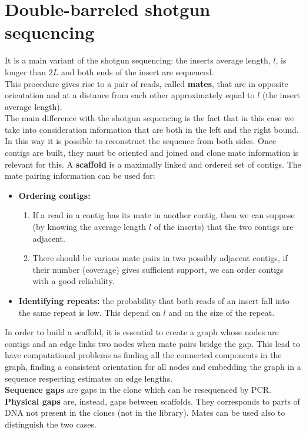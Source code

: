 \section{Double-barreled shotgun sequencing}
It is a main variant of the shotgun sequencing: the inserts average length, $l$, is longer than $2L$ and both ends of the insert are sequenced.\\
This procedure gives rise to a pair of reads, called \textbf{mates}, that are in opposite orientation and at a distance from each other approximately equal to $l$ (the insert average length).\\
The main difference with the shotgun sequencing is the fact that in this case we take into consideration information that are both in the left and the right bound. In this way it is possible to reconstruct the sequence from both sides.
Once contigs are built, they must be oriented and joined and clone mate information is relevant for this.
A \textbf{scaffold} is a maximally linked and ordered set of contigs.
The mate pairing information can be used for:
\begin{itemize}
	\item \textbf{Ordering contigs:}
		\begin{enumerate}
			\item If a read in a contig has its mate in another contig, then we can suppose (by knowing the average length $l$ of the inserts) that the two contigs are adjacent.
			\item There should be various mate pairs in two possibly adjacent contigs, if their number (coverage) gives sufficient support, we can order contigs with a good reliability.
		\end{enumerate}
	\item \textbf{Identifying repeats:} the probability that both reads of an insert fall into the same repeat is low. This depend on $l$ and on the size of the repeat.
\end{itemize}
In order to build a scaffold, it is essential to create a graph whose nodes are contigs and an edge links two nodes when mate pairs bridge the gap. This lead to have computational problems as finding all the connected components in the graph, finding a consistent orientation for all nodes and embedding the graph in a sequence respecting estimates on edge lengths.\\
\textbf{Sequence gaps} are gaps in the clone which can be resequenced by PCR. \textbf{Physical gaps} are, instead, gaps between scaffolds. They corresponds to parts of DNA not present in the clones (not in the library). Mates can be used also to distinguish the two cases. 

